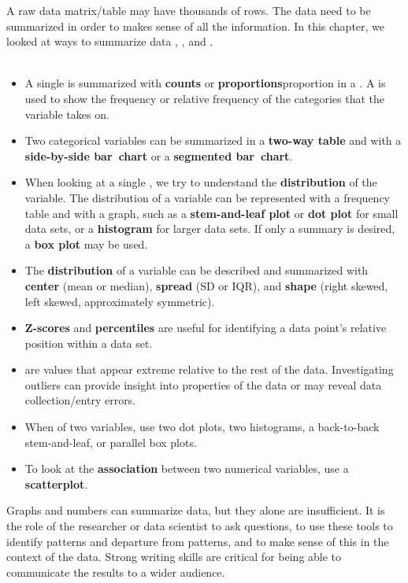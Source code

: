\noindent A raw data matrix/table may have thousands of rows.  The data need to be summarized in order to makes sense of all the information.  In this chapter, we looked at ways to summarize data , , and .  
\\
\\
\begin{itemize}

\item A single  is summarized with \textbf{counts} or \textbf{proportions}{proportion} in a .  A  is used to show the frequency or relative frequency of the categories that the variable takes on.
\item Two categorical variables can be summarized in a \textbf{two-way table} and with a \textbf{side-by-side bar~chart} or a \textbf{segmented bar~chart}.
\end{itemize}
\begin{itemize}
\item When looking at a single , we try to understand the \textbf{distribution} of the variable.  The distribution of a variable can be represented with a frequency table and with a graph, such as a \textbf{stem-and-leaf plot} or \textbf{dot plot} for small data sets, or a \textbf {histogram} for larger data sets.  If only a summary is desired, a \textbf{box plot} may be used.
\item The \textbf{distribution} of a variable can be described and summarized with \textbf{center} (mean or median), \textbf{spread} (SD or IQR), and \textbf{shape} (right skewed, left skewed, approximately symmetric). 
\item \textbf{Z-scores} and \textbf{percentiles} are useful for identifying a data point's relative position within a data set.
\item {} are values that appear extreme relative to the rest of the data.  Investigating outliers can provide insight into properties of the data or may reveal data collection/entry errors.
\item When  of two variables, use two dot plots, two histograms, a back-to-back stem-and-leaf, or parallel box plots.
\item To look at the \textbf{association} between two numerical variables, use a \textbf{scatterplot}.
\end{itemize}
Graphs and numbers can summarize data, but they alone are insufficient.  It is the role of the researcher or data scientist to ask questions, to use these tools to identify patterns and departure from patterns, and to make sense of this in the context of the data.  Strong writing skills are critical for being able to communicate the results to a wider audience.  


